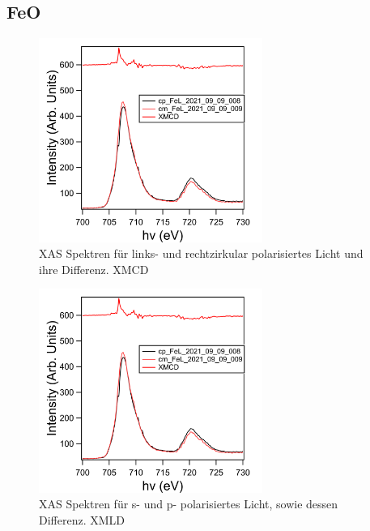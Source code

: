         \subsection{FeO}
            \begin{figure}
                \centering
                \includegraphics[width=0.65\textwidth]{./content/pictures/FeO/XMCD.png}
                \caption{XAS Spektren für links- und rechtzirkular polarisiertes Licht und ihre Differenz. XMCD}
                \label{fig:XMCD}
            \end{figure}
            \begin{figure}
                \centering
                \includegraphics[width=0.65\textwidth]{./content/pictures/FeO/XMCD.png}
                \caption{XAS Spektren für s- und p- polarisiertes Licht, sowie dessen Differenz. XMLD}
                \label{fig:XMLD}
            \end{figure}
